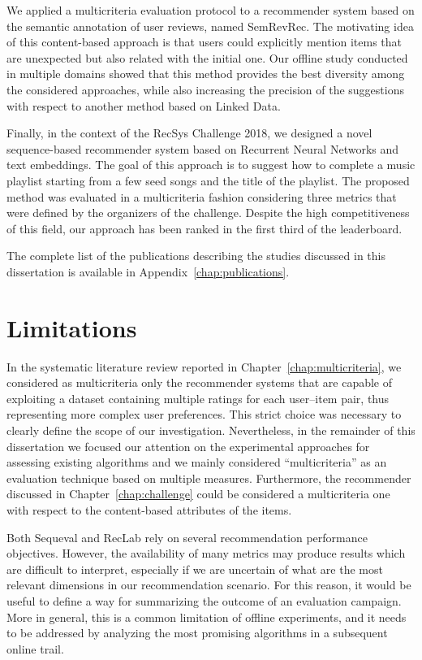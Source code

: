 We applied a multicriteria evaluation protocol to a recommender system based on the semantic annotation of user reviews, named SemRevRec. The motivating idea of this content-based approach is that users could explicitly mention items that are unexpected but also related with the initial one. Our offline study conducted in multiple domains showed that this method provides the best diversity among the considered approaches, while also increasing the precision of the suggestions with respect to another method based on Linked Data.

Finally, in the context of the RecSys Challenge 2018, we designed a novel sequence-based recommender system based on Recurrent Neural Networks and text embeddings. The goal of this approach is to suggest how to complete a music playlist starting from a few seed songs and the title of the playlist. The proposed method was evaluated in a multicriteria fashion considering three metrics that were defined by the organizers of the challenge. Despite the high competitiveness of this field, our approach has been ranked in the first third of the leaderboard.

The complete list of the publications describing the studies discussed in this dissertation is available in Appendix~\ref{chap:publications}.

\section{Limitations}

In the systematic literature review reported in Chapter~\ref{chap:multicriteria}, we considered as multicriteria only the recommender systems that are capable of exploiting a dataset containing multiple ratings for each user--item pair, thus representing more complex user preferences. This strict choice was necessary to clearly define the scope of our investigation. Nevertheless, in the remainder of this dissertation we focused our attention on the experimental approaches for assessing existing algorithms and we mainly considered ``multicriteria'' as an evaluation technique based on multiple measures. Furthermore, the recommender discussed in Chapter~\ref{chap:challenge} could be considered a multicriteria one with respect to the content-based attributes of the items.

Both Sequeval and RecLab rely on several recommendation performance objectives. However, the availability of many metrics may produce results which are difficult to interpret, especially if we are uncertain of what are the most relevant dimensions in our recommendation scenario. For this reason, it would be useful to define a way for summarizing the outcome of an evaluation campaign. More in general, this is a common limitation of offline experiments, and it needs to be addressed by analyzing the most promising algorithms in a subsequent online trail.

